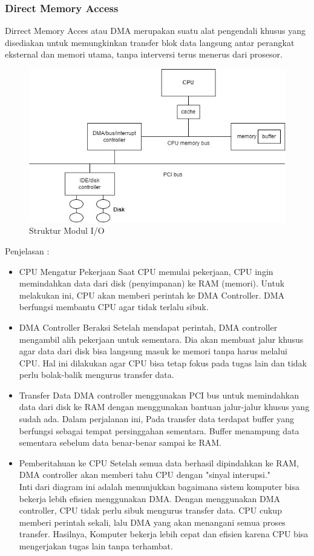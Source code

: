 \documentclass[12pt]{article}
\begin{document}
\subsubsection{Direct Memory Access}
Dirrect Memory Acces atau DMA merupakan suatu alat pengendali khusus yang disediakan untuk memungkinkan transfer blok data langsung antar perangkat eksternal dan memori utama, tanpa interversi terus menerus dari prosesor. \\
\begin{figure}[h]
    \centering
    \includegraphics[width=0.80\linewidth]{b_class/asset/I_O.jpg}
    \caption{Struktur Modul I/O}
    \label{fig:enter-label}
\end{figure}
Penjelasan :
\begin{itemize}
    \item CPU Mengatur Pekerjaan
    Saat CPU memulai pekerjaan, CPU ingin memindahkan data dari disk (penyimpanan) ke RAM (memori). Untuk melakukan ini, CPU akan memberi perintah ke DMA Controller. DMA berfungsi membantu CPU agar tidak terlalu sibuk.
    \item DMA Controller Beraksi
    Setelah mendapat perintah, DMA controller mengambil alih pekerjaan untuk sementara. Dia akan membuat jalur khusus agar data dari disk bisa langsung masuk ke memori tanpa harus melalui CPU. Hal ini dilakukan agar CPU bisa tetap fokus pada tugas lain dan tidak perlu bolak-balik mengurus transfer data.
    \item Transfer Data
    DMA controller menggunakan PCI bus untuk memindahkan data dari disk ke RAM dengan menggunakan bantuan jalur-jalur khusus yang sudah ada. Dalam perjalanan ini, Pada transfer data terdapat buffer yang berfungsi sebagai tempat persinggahan sementara. Buffer menampung data sementara sebelum data benar-benar sampai ke RAM.
    \item Pemberitahuan ke CPU
    Setelah semua data berhasil dipindahkan ke RAM, DMA controller akan memberi tahu CPU dengan "sinyal interupsi." \\
    Inti dari diagram ini adalah menunjukkan bagaimana sistem komputer bisa bekerja lebih efisien menggunakan DMA. Dengan menggunakan DMA controller, CPU tidak perlu sibuk mengurus transfer data. CPU cukup memberi perintah sekali, lalu DMA yang akan menangani semua proses transfer. Hasilnya, Komputer bekerja lebih cepat dan efisien karena CPU bisa mengerjakan tugas lain tanpa terhambat.
\end{itemize}
\end{document}
